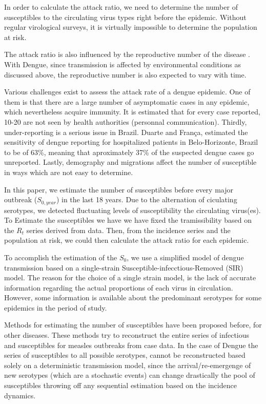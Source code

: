 In order to calculate the attack ratio, we need to determine the number of 
susceptibles to the circulating virus types right before the epidemic. Without 
regular virological surveys, it is virtually impossible to determine the 
population at risk.

The attack ratio is also influenced by the reproductive number of the disease 
\cite{bacaer_final_2009, katriel_attack_2012}. With Dengue, since transmission 
is affected by environmental conditions as discussed above, the reproductive 
number is also expected to vary with time.

Various challenges exist to assess the attack rate of a dengue epidemic. One of 
them is that there are a large number of asymptomatic cases in any epidemic, 
which nevertheless acquire immunity. It is estimated that for 
every case reported, 10-20 are not seen by health authorities (personnal 
communication).
Thirdly, under-reporting is a serious issue in Brazil. 
Duarte and Fran\c{c}a\cite{duarte_data_2006}, estimated 
the sensitivity of dengue reporting for hospitalized patients in 
Belo-Horizonte, Brazil to be of 63\%, 
meaning that aproximately 37\% of the suspected dengue cases go unreported.  
Lastly, demography and migrations affect the number of susceptible in ways which 
are not easy to determine.


In this paper, we estimate the number of susceptibles before every major 
outbreak ($S_{0, year}$) in the last 18 years. Due to the alternation of 
ciculating serotypes, we detected fluctuating levels of susceptibility the 
circulating virus(es). To Estimate the susceptibles we have we have fixed the 
tramissibility based on the $R_t$ series derived from data\cite{nishiura}. Then, 
from the incidence series and the population at risk, we could then calculate 
the attack ratio for each epidemic.

To accomplish the estimation of the $S_0$, we use a simplified model of 
dengue transmission based on a single-strain Susceptible-infecctious-Removed 
(SIR) model. The reason for the choice of a single strain model, is the lack of 
accurate information regarding the actual proportions of each virus in 
circulation. However, some information is available about the predominant 
serotypes for some epidemics in the period 
of study\cite{macedo_virological_2013}. 

Methods for estimating the  number of susceptibles have been proposed 
before, for other diseases\cite{bjornstad_dynamics_2002, 
wallinga_reconstruction_2003}. These methods try to reconstruct the entire 
series of infectious and susceptibles for measles 
outbreaks from case data. In the case of Dengue the 
series of susceptibles to all possible serotypes, cannot be reconstructed based 
solely on a deterministic transmission model, since the arrival/re-emergenge of 
new serotypes (which are a stochastic events) can change drastically the pool 
of susceptibles throwing off any sequential estimation based on the incidence
dynamics.

